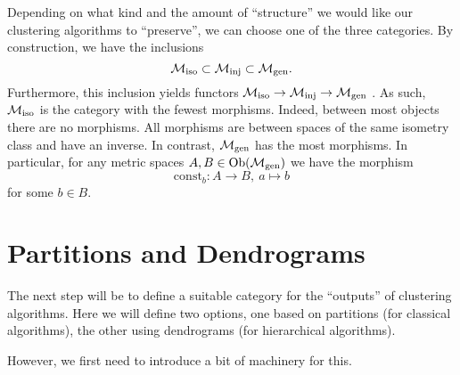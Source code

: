 Depending on what kind and the amount of ``structure'' we would like our clustering algorithms to ``preserve'', we can choose one of the three categories.
By construction, we have the inclusions
\begin{equation}
    \label{eq:inclusions_of_finite_metric_space_categories}
    {\mathcal{M}_\mathrm{iso}} \subset {\mathcal{M}_\mathrm{inj}} \subset {\mathcal{M}_\mathrm{gen}}.
\end{equation}
Furthermore, this inclusion yields functors ${\mathcal{M}_\mathrm{iso}} \to {\mathcal{M}_\mathrm{inj}} \to {\mathcal{M}_\mathrm{gen}}$ \cite[Def.~1.2.18]{Leinster2014-dc}.
As such, ${\mathcal{M}_\mathrm{iso}}$ is the category with the fewest morphisms. Indeed, between most objects there are no morphisms.
All morphisms are between spaces of the same isometry class and have an inverse.
In contrast, ${\mathcal{M}_\mathrm{gen}}$ has the most morphisms. In particular, for any metric spaces $A,B \in \mathrm {Ob}({\mathcal{M}_\mathrm{gen}})$ we have the morphism
$$
\mathrm{const}_b\colon A \to B, \ a \mapsto b
$$
for some $b \in B$.

\section{Partitions and Dendrograms}
\label{section__partitions}

The next step will be to define a suitable category for the ``outputs'' of clustering algorithms. Here we will define two options, one based on partitions (for classical algorithms), the other using dendrograms (for hierarchical algorithms).

However, we first need to introduce a bit of machinery for this.


